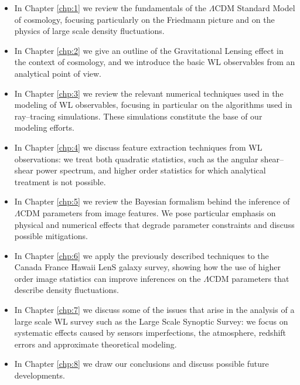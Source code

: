 \begin{itemize}

	\item In Chapter \ref{chp:1} we review the fundamentals of the $\Lambda$CDM Standard Model of cosmology, focusing particularly on the Friedmann picture and on the physics of large scale density fluctuations.
	
	\item In Chapter \ref{chp:2} we give an outline of the Gravitational Lensing effect in the context of cosmology, and we introduce the basic WL observables from an analytical point of view.
	
	\item In Chapter \ref{chp:3} we review the relevant numerical techniques used in the modeling of WL observables, focusing in particular on the algorithms used in ray--tracing simulations. These simulations constitute the base of our modeling efforts.  
	
	\item In Chapter \ref{chp:4} we discuss feature extraction techniques from WL observations: we treat both quadratic statistics, such as the angular shear--shear power spectrum, and higher order statistics for which analytical treatment is not possible.
	
	\item In Chapter \ref{chp:5} we review the Bayesian formalism behind the inference of $\Lambda$CDM parameters from image features. We pose particular emphasis on physical and numerical effects that degrade parameter constraints and discuss possible mitigations.
	
	\item In Chapter \ref{chp:6} we apply the previously described techniques to the Canada France Hawaii LenS galaxy survey, showing how the use of higher order image statistics can improve inferences on the $\Lambda$CDM parameters that describe density fluctuations. 
	
	\item In Chapter \ref{chp:7} we discuss some of the issues that arise in the analysis of a large scale WL survey such as the Large Scale Synoptic Survey: we focus on systematic effects caused by sensors imperfections, the atmosphere, redshift errors and approximate theoretical modeling.
	
	\item In Chapter \ref{chp:8} we draw our conclusions and discuss possible future developments.

\end{itemize}